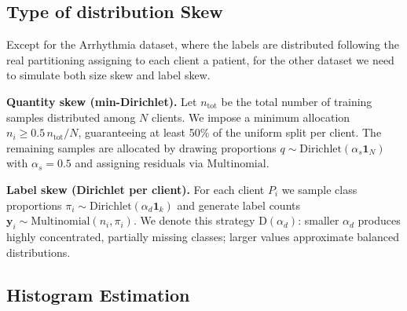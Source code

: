 \documentclass[runningheads]{llncs}
\begin{document}
\subsection{Type of distribution Skew}
Except for the Arrhythmia dataset, where the labels are distributed following the real partitioning assigning to each client a patient, for the other dataset we need to simulate both size skew and label skew. 

\textbf{Quantity skew (min-Dirichlet).}
Let $n_{\mathrm{tot}}$ be the total number of training samples distributed among $N$ clients.
We impose a minimum allocation $n_i \ge 0.5\,n_{\mathrm{tot}}/N$, guaranteeing at least 50\% of the uniform split per client.
The remaining samples are allocated by drawing proportions $q \sim \mathrm{Dirichlet}(\alpha_s \mathbf{1}_N)$ with $\alpha_s = 0.5$ and assigning residuals via $\mathrm{Multinomial}$.

\textbf{Label skew (Dirichlet per client).}
For each client $P_i$ we sample class proportions $\pi_i \sim \mathrm{Dirichlet}(\alpha_d \mathbf{1}_k)$ and generate label counts $\mathbf{y}_i \sim \mathrm{Multinomial}(n_i,\pi_i)$.
We denote this strategy $\mathrm{D}(\alpha_d)$: smaller $\alpha_d$ produces highly concentrated, partially missing classes; larger values approximate balanced distributions.

\subsection{Histogram Estimation}
\end{document}
